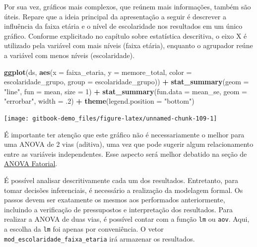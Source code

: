 \documentclass[
]{book}
\newenvironment{Shaded}{\begin{snugshade}}{\end{snugshade}}
\newcommand{\DataTypeTok}[1]{\textcolor[rgb]{0.13,0.29,0.53}{#1}}
\newcommand{\DecValTok}[1]{\textcolor[rgb]{0.00,0.00,0.81}{#1}}
\newcommand{\FloatTok}[1]{\textcolor[rgb]{0.00,0.00,0.81}{#1}}
\newcommand{\KeywordTok}[1]{\textcolor[rgb]{0.13,0.29,0.53}{\textbf{#1}}}
\newcommand{\NormalTok}[1]{#1}
\newcommand{\OperatorTok}[1]{\textcolor[rgb]{0.81,0.36,0.00}{\textbf{#1}}}
\newcommand{\StringTok}[1]{\textcolor[rgb]{0.31,0.60,0.02}{#1}}
\begin{document}
Por sua vez, gráficos mais complexos, que reúnem mais informações, também são úteis. Repare que a ideia principal da apresentação a seguir é descrever a influência da faixa etária e o nível de escolaridade nos resultados em um único gráfico. Conforme explicitado no capítulo sobre estatística descritiva, o eixo X é utilizado pela variável com mais níveis (faixa etária), enquanto o agrupador reúne a variável com menos níveis (escolaridade).

\begin{Shaded}
\begin{Highlighting}[]
\KeywordTok{ggplot}\NormalTok{(ds, }\KeywordTok{aes}\NormalTok{(}\DataTypeTok{x =}\NormalTok{ faixa_etaria, }\DataTypeTok{y =}\NormalTok{ memore_total, }\DataTypeTok{color =}\NormalTok{ escolaridade_grupo, }\DataTypeTok{group  =}\NormalTok{ escolaridade_grupo)) }\OperatorTok{+}
\StringTok{  }\KeywordTok{stat_summary}\NormalTok{(}\DataTypeTok{geom =} \StringTok{"line"}\NormalTok{, }\DataTypeTok{fun =}\NormalTok{ mean, }\DataTypeTok{size =} \DecValTok{1}\NormalTok{) }\OperatorTok{+}
\StringTok{  }\KeywordTok{stat_summary}\NormalTok{(}\DataTypeTok{fun.data =}\NormalTok{ mean_se, }\DataTypeTok{geom =} \StringTok{"errorbar"}\NormalTok{, }\DataTypeTok{width =} \FloatTok{.2}\NormalTok{) }\OperatorTok{+}
\StringTok{  }\KeywordTok{theme}\NormalTok{(}\DataTypeTok{legend.position =} \StringTok{"bottom"}\NormalTok{)}
\end{Highlighting}
\end{Shaded}

\begin{center}\texttt{[image: gitbook-demo\_files/figure-latex/unnamed-chunk-109-1]} \end{center}

É importante ter atenção que este gráfico não é necessariamente o melhor para uma ANOVA de 2 vias (aditiva), uma vez que pode sugerir algum relacionamento entre as variáveis independentes. Esse aspecto será melhor debatido na seção de \protect\hyperlink{anova_fatorial}{ANOVA Fatorial}.

É possível analisar descritivamente cada um dos resultados. Entretanto, para tomar decisões inferenciais, é necessário a realização da modelagem formal. Os passos devem ser exatamente os mesmos aos performados anteriormente, incluindo a verificação de pressupostos e interpretação dos resultados. Para realizar a ANOVA de duas vias, é possível contar com a função \texttt{lm} ou \texttt{aov}. Aqui, a escolha da \texttt{lm} foi apenas por conveniência. O vetor \texttt{mod\_escolaridade\_faixa\_etaria} irá armazenar os resultados.
\end{document}
